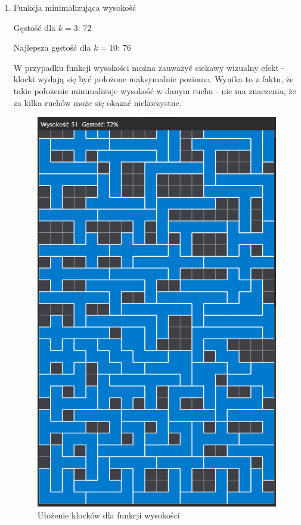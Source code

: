\documentclass{article}
\begin{document}
\begin{enumerate}
\item Funkcja minimalizująca wysokość

Gęstość dla $k=3$: 72

Najlepsza gęstość dla $k=10$: 76

W przypadku funkcji wysokości można zauważyć ciekawy wizualny efekt - klocki wydają się być położone maksymalnie poziomo.
Wynika to z faktu, że takie położenie minimalizuje wysokość w danym ruchu - nie ma znaczenia, że za kilka ruchów może się okazać niekorzystne.

\begin{figure}[H]
\includegraphics[width=\textwidth]{wysokosc.PNG}
\caption{Ułożenie klocków dla funkcji wysokości}
\end{figure}


\end{enumerate}
\end{document}
